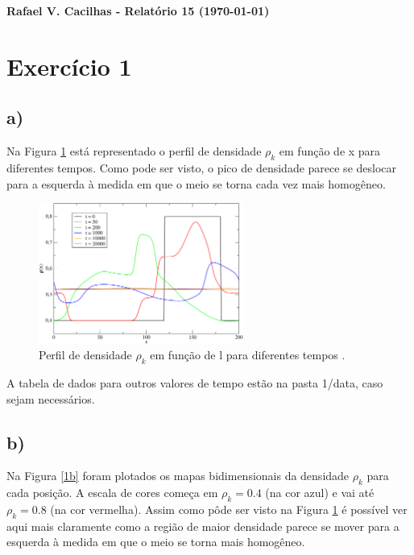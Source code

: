 \documentclass[a4wide]{report}
\begin{document}
\noindent
{\bf Rafael V. Cacilhas  - Relatório 15 (\today)}

\vspace{0.5cm}

\section*{Exercício 1}

\subsection*{a) }
Na Figura \ref{1a} está representado o perfil de densidade $\rho_k$ em função de x para diferentes tempos. Como pode ser visto, o pico de densidade parece se deslocar para a esquerda à medida em que o meio se torna cada vez mais homogêneo. 
\begin{figure}[!htb]
\centering
\includegraphics[width=0.6\textwidth]{perfil.pdf}
\caption{Perfil de densidade $\rho_k$ em função de l para diferentes tempos .}
\label{1a}
\end{figure}

A tabela de dados para outros valores de tempo estão na pasta 1/data, caso sejam necessários.

\subsection*{b) }
Na Figura \ref{1b} foram plotados os mapas bidimensionais da densidade $\rho_k$ para cada posição. A escala de cores começa em $\rho_k = 0.4$ (na cor azul) e vai até $\rho_k = 0.8$ (na cor vermelha). Assim como pôde ser visto na Figura \ref{1a} é possível ver aqui mais claramente como a região de maior densidade parece se mover para a esquerda à medida em que o meio se torna mais homogêneo.
\end{document}
